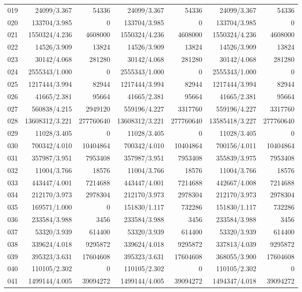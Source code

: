 \begin{longtable}{crrrrrr}
019 & 24099/3.367 & 54336 & 24099/3.367 & 54336 & 24099/3.367 & 54336 \\
020 & 133704/3.985 & 0 & 133704/3.985 & 0 & 133704/3.985 & 0 \\
021 & 1550324/4.236 & 4608000 & 1550324/4.236 & 4608000 & 1550324/4.236 & 4608000 \\
022 & 14526/3.909 & 13824 & 14526/3.909 & 13824 & 14526/3.909 & 13824 \\
023 & 30142/4.068 & 281280 & 30142/4.068 & 281280 & 30142/4.068 & 281280 \\
024 & 2555343/1.000 & 0 & 2555343/1.000 & 0 & 2555343/1.000 & 0 \\
025 & 1217444/3.994 & 82944 & 1217444/3.994 & 82944 & 1217444/3.994 & 82944 \\
026 & 41665/2.381 & 95664 & 41665/2.381 & 95664 & 41665/2.381 & 95664 \\
027 & 560838/4.215 & 2949120 & 559196/4.227 & 3317760 & 559196/4.227 & 3317760 \\
028 & 13608312/3.221 & 277760640 & 13608312/3.221 & 277760640 & 13585418/3.227 & 277760640 \\
029 & 11028/3.405 & 0 & 11028/3.405 & 0 & 11028/3.405 & 0 \\
030 & 700342/4.010 & 10404864 & 700342/4.010 & 10404864 & 700156/4.011 & 10404864 \\
031 & 357987/3.951 & 7953408 & 357987/3.951 & 7953408 & 355839/3.975 & 7953408 \\
032 & 11004/3.766 & 18576 & 11004/3.766 & 18576 & 11004/3.766 & 18576 \\
033 & 443447/4.001 & 7214688 & 443447/4.001 & 7214688 & 442667/4.008 & 7214688 \\
034 & 212170/3.973 & 2978304 & 212170/3.973 & 2978304 & 212170/3.973 & 2978304 \\
035 & 169571/1.000 & 0 & 151830/1.117 & 732286 & 151830/1.117 & 732286 \\
036 & 233584/3.988 & 3456 & 233584/3.988 & 3456 & 233584/3.988 & 3456 \\
037 & 53320/3.939 & 614400 & 53320/3.939 & 614400 & 53320/3.939 & 614400 \\
038 & 339624/4.018 & 9295872 & 339624/4.018 & 9295872 & 337813/4.039 & 9295872 \\
039 & 395323/3.631 & 17604608 & 395323/3.631 & 17604608 & 368055/3.900 & 17604608 \\
040 & 110105/2.302 & 0 & 110105/2.302 & 0 & 110105/2.302 & 0 \\
041 & 1499144/4.005 & 39094272 & 1499144/4.005 & 39094272 & 1494347/4.018 & 39094272 \\

\end{longtable}
